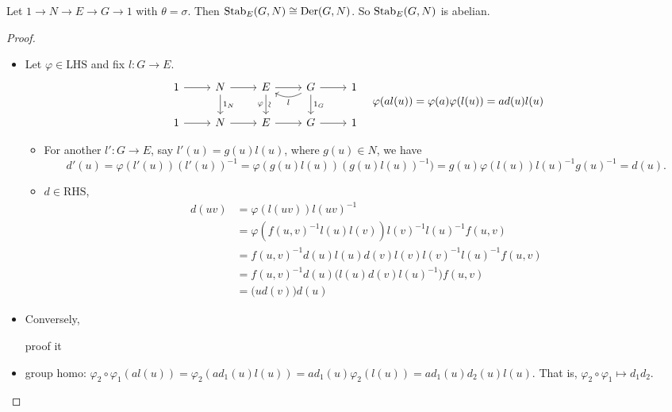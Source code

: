 \begin{theorem}
  Let $1\to N\to E\to G\to 1$ with $\theta = \sigma$. Then
  $\operatorname{Stab}_E(G, N) \cong \operatorname{Der}(G, N)$. So $\operatorname{Stab}_E(G, N)$ is abelian.
  \begin{proof} \mbox{}
    \begin{itemize}
      \item Let $\varphi \in \text{LHS}$ and fix $l:G\to E$.
        \[
          \begin{tikzcd}
            1 \arrow[r]
            & N \arrow[d, "1_N"] \arrow[r]
            & E \arrow[d, "\rotatebox{90}{\(\sim\)}", "\varphi"'] \arrow[r]
            & G \arrow[d, "1_G"] \arrow[r] \arrow[l, bend left, "l"]
            & 1 \\
            1 \arrow[r] & N \arrow[r] & E \arrow[r] & G \arrow[r] & 1
          \end{tikzcd}
          \quad \varphi(al(u)) = \varphi(a)\varphi(l(u)) = a d(u) l(u)
        \]
        \begin{itemize}
          \item For another $l':G\to E$, say $l'(u) = g(u)l(u)$, where
            $g(u) \in N$,
            we have
            \[ d'(u) = \varphi(l'(u))(l'(u))^{-1}
            = \varphi(g(u)l(u))(g(u)l(u))^{-1})
            = g(u)\varphi(l(u)) l(u)^{-1} g(u)^{-1} = d(u).
            \]

          \item $d \in \text{RHS}$, 
            \begin{align*}
              d(uv) &= \varphi(l(uv))l(uv)^{-1} \\
                    &= \varphi(f(u, v)^{-1} l(u)l(v)) l(v)^{-1} l(u)^{-1} f(u, v) \\
                    &= f(u, v)^{-1} d(u)l(u) d(v)l(v) l(v)^{-1} l(u)^{-1} f(u, v) \\
                    &= f(u, v)^{-1} d(u) \big(l(u) d(v) l(u)^{-1}\big) f(u, v) \\
                    &= \big(u d(v)\big) d(u)
            \end{align*}
        \end{itemize}

      \item Conversely, \begin{exercise} proof it \end{exercise}
      \item group homo:
        $\varphi_2\circ\varphi_1(al(u)) = \varphi_2(ad_1(u)l(u))
        = ad_1(u)\varphi_2(l(u)) = a d_1(u) d_2(u) l(u)$.
        That is, $\varphi_2 \circ \varphi_1 \mapsto d_1 d_2$.
        \qedhere
    \end{itemize}
  \end{proof}
\end{theorem}

